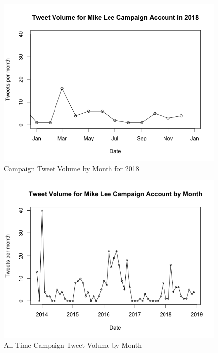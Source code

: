 \documentclass{article}
\begin{document}
\begin{figure}[h!]
\includegraphics[width =\textwidth]{image/tweet_volume_campaign_2018.png}
\caption{Campaign Tweet Volume by Month for 2018 }
\centering
\end{figure}
\begin{figure}[h!]
\includegraphics[width =\textwidth]{image/tweet_volume_campaign_alltime.png}
\caption{All-Time Campaign Tweet Volume by Month}
\end{figure}
\end{document}
